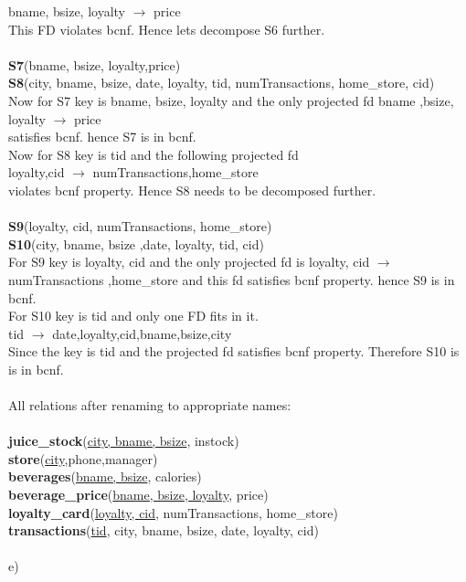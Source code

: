 \documentclass{article}
\begin{document}
\begin{enumerate}
		bname, bsize, loyalty $\rightarrow$ price\\
	  This FD violates bcnf. Hence lets decompose S6 further.\\\\
	  \textbf{S7}(bname, bsize, loyalty,price)\\
	  \textbf{S8}(city, bname, bsize, date, loyalty, tid, numTransactions, home\_store, cid)\\
	  Now for S7 key is bname, bsize, loyalty and the only projected fd bname ,bsize, loyalty $\rightarrow$ price\\ satisfies bcnf.
	  hence S7 is in bcnf.\\
	  Now for S8 key is tid and the following projected fd \\		loyalty,cid $\rightarrow$ numTransactions,home\_store\\
	 violates bcnf property. Hence S8 needs to be decomposed further.\\\\
	   \textbf{S9}(loyalty, cid, numTransactions, home\_store)\\
	   \textbf{S10}(city, bname, bsize ,date, loyalty, tid, cid)\\
	  For S9 key is loyalty, cid and the only projected fd is loyalty, cid $\rightarrow$ numTransactions ,home\_store and this fd satisfies bcnf property.
	  hence S9 is in bcnf.\\
	  For S10 key is tid and only one FD fits in it.\\
		tid $\rightarrow$ date,loyalty,cid,bname,bsize,city\\
	  Since the key is tid and the projected fd satisfies bcnf property. Therefore S10 is is in bcnf.\\\\
	  All relations after renaming to appropriate names:\\\\
		 \textbf{juice\_stock}(\underline{city, bname, bsize}, instock)\\
		 \textbf{store}(\underline{city},phone,manager)\\
		 \textbf{beverages}(\underline{bname, bsize}, calories)\\
		 \textbf{beverage\_price}(\underline{bname, bsize, loyalty}, price)\\
		 \textbf{loyalty\_card}(\underline{loyalty, cid}, numTransactions, home\_store)\\
		 \textbf{transactions}(\underline{tid}, city, bname, bsize, date, loyalty, cid)\\\\
	e)
	

\end{enumerate}
\end{document}
